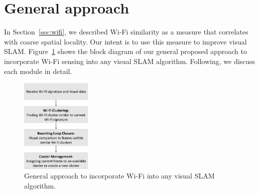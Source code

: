 \section{General approach}
\label{sec:slam}
In Section~\ref{sec:wifi}, we described Wi-Fi similarity as a measure that correlates with coarse spatial locality. Our intent is to use this measure to improve visual SLAM. Figure~\ref{fig:gen_approach} shows the block diagram of our general proposed approach to incorporate Wi-Fi sensing into any visual SLAM algorithm. Following, we discuss each module in detail.
\begin{figure}
	\centering
	\includegraphics[width=0.3\textwidth]{Figure2.eps}
	\caption{General approach to incorporate Wi-Fi into any visual SLAM algorithm.}
\label{fig:gen_approach}
\end{figure}

